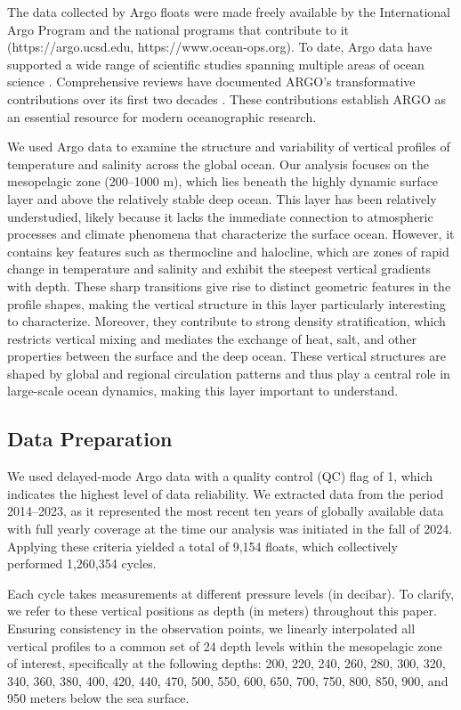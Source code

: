 \documentclass[11pt]{article}
\theoremstyle{plain}
\begin{document}
The data collected by Argo floats were made freely available by the International Argo Program and the national programs that contribute to it (https://argo.ucsd.edu, https://www.ocean-ops.org). To date, Argo data have supported a wide range of scientific studies spanning multiple areas of ocean science \citep{roemmich20092004,durack2010fifty,cheng2015global,johnson2016improving}. Comprehensive reviews have documented ARGO’s transformative contributions over its first two decades \citep{riser2016fifteen,johnson2022argo}. These contributions establish ARGO as an essential resource for modern oceanographic research.

We used Argo data to examine the structure and variability of vertical profiles of temperature and salinity across the global ocean. Our analysis focuses on the mesopelagic zone (200–1000 m), which lies beneath the highly dynamic surface layer and above the relatively stable deep ocean. This layer has been relatively understudied, likely because it lacks the immediate connection to atmospheric processes and climate phenomena that characterize the surface ocean. However, it contains key features such as thermocline and halocline, which are zones of rapid change in temperature and salinity and exhibit the steepest vertical gradients with depth. These sharp transitions give rise to distinct geometric features in the profile shapes, making the vertical structure in this layer particularly interesting to characterize. Moreover, they contribute to strong density stratification, which restricts vertical mixing and mediates the exchange of heat, salt, and other properties between the surface and the deep ocean. These vertical structures are shaped by global and regional circulation patterns and thus play a central role in large-scale ocean dynamics, making this layer important to understand.

\subsection{Data Preparation}
We used delayed-mode Argo data with a quality control (QC) flag of 1, which indicates the highest level of data reliability. We extracted data from the period 2014–2023, as it represented the most recent ten years of globally available data with full yearly coverage at the time our analysis was initiated in the fall of 2024. Applying these criteria yielded a total of 9,154 floats, which collectively performed 1,260,354 cycles.

Each cycle takes measurements at different pressure levels (in decibar). To clarify, we refer to these vertical positions as depth (in meters) throughout this paper. Ensuring consistency in the observation points, we linearly interpolated all vertical profiles to a common set of 24 depth levels within the mesopelagic zone of interest, specifically at the following depths: 200, 220, 240, 260, 280, 300, 320, 340, 360, 380, 400, 420, 440, 470, 500, 550, 600, 650, 700, 750, 800, 850, 900, and 950 meters below the sea surface.
\end{document}

